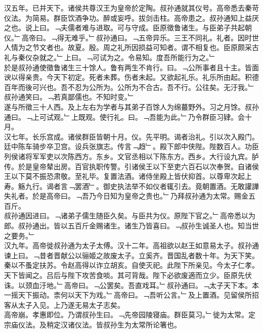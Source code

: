 \documentclass{zhvt-classic}
\begin{document}
\hspace*{2em}汉五年。已并天下。诸侯共尊汉王为皇帝於定陶。叔孙通就其仪号。高帝悉去秦苛仪法。为简易。群臣饮酒争功。醉或妄呼。拔剑击柱。高帝患之。叔孙通知上益厌之也。说上曰。﹁夫儒者难与进取。可与守成。臣原徵鲁诸生。与臣弟子共起朝仪。﹂高帝曰。﹁得无难乎。﹂叔孙通曰。﹁五帝异乐。三王不同礼。礼者。因时世人情为之节文者也。故夏。殷。周之礼所因损益可知者。谓不相复也。臣原颇采古礼与秦仪杂就之。﹂上曰。﹁可试为之。令易知。度吾所能行为之。﹂\\
\hspace*{2em}於是叔孙通使徵鲁诸生三十馀人。鲁有两生不肯行。曰。﹁公所事者且十主。皆面谀以得亲贵。今天下初定。死者未葬。伤者未起。又欲起礼乐。礼乐所由起。积德百年而後可兴也。吾不忍为公所为。公所为不合古。吾不行。公往矣。无汙我。﹂叔孙通笑曰。﹁若真鄙儒也。不知时变。﹂\\
\hspace*{2em}遂与所徵三十人西。及上左右为学者与其弟子百馀人为绵蕞野外。习之月馀。叔孙通曰。﹁上可试观。﹂上既观。使行礼。曰。﹁吾能为此。﹂乃令群臣习肄。会十月。\\
\hspace*{2em}汉七年。长乐宫成。诸侯群臣皆朝十月。仪。先平明。谒者治礼。引以次入殿门。廷中陈车骑步卒卫宫。设兵张旗志。传言﹁趋﹂。殿下郎中侠陛。陛数百人。功臣列侯诸将军军吏以次陈西方。东乡。文官丞相以下陈东方。西乡。大行设九宾。胪传。於是皇帝辇出房。百官执职传警。引诸侯王以下至吏六百石以次奉贺。自诸侯王以下莫不振恐肃敬。至礼毕。复置法酒。诸侍坐殿上皆伏抑首。以尊卑次起上寿。觞九行。谒者言﹁罢酒﹂。御史执法举不如仪者辄引去。竟朝置酒。无敢讙譁失礼者。於是高帝曰。﹁吾乃今日知为皇帝之贵也。﹂乃拜叔孙通为太常。赐金五百斤。\\
\hspace*{2em}叔孙通因进曰。﹁诸弟子儒生随臣久矣。与臣共为仪。原陛下官之。﹂高帝悉以为郎。叔孙通出。皆以五百斤金赐诸生。诸生乃皆喜曰。﹁叔孙生诚圣人也。知当世之要务。﹂\\
\hspace*{2em}汉九年。高帝徙叔孙通为太子太傅。汉十二年。高祖欲以赵王如意易太子。叔孙通谏上曰。﹁昔者晋献公以骊姬之故废太子。立奚齐。晋国乱者数十年。为天下笑。秦以不蚤定扶苏。令赵高得以诈立胡亥。自使灭祀。此陛下所亲见。今太子仁孝。天下皆闻之。吕后与陛下攻苦食啖。其可背哉。陛下必欲废適而立少。臣原先伏诛。以颈血汙地。﹂高帝曰。﹁公罢矣。吾直戏耳。﹂叔孙通曰。﹁太子天下本。本一摇天下振动。柰何以天下为戏。﹂高帝曰。﹁吾听公言。﹂及上置酒。见留侯所招客从太子入见。上乃遂无易太子志矣。\\
\hspace*{2em}高帝崩。孝惠即位。乃谓叔孙生曰。﹁先帝园陵寝庙。群臣莫习。﹂徙为太常。定宗庙仪法。及稍定汉诸仪法。皆叔孙生为太常所论箸也。\\
\end{document}
